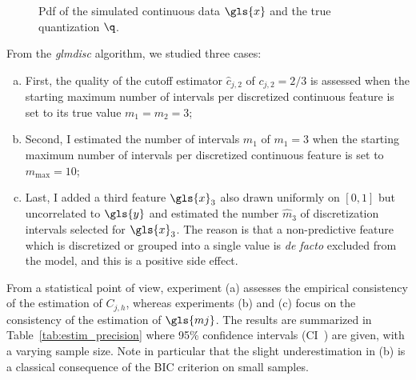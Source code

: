 \begin{figure}[!ht]
\centering
{}
\caption{\label{fig:exp_sim} Pdf of the simulated continuous data $\gls{x}$ and the true quantization $\q$.}
\end{figure}


From the \textit{glmdisc} algorithm, we studied three cases:
\begin{enumerate}[(a)]
    \item First, the quality of the cutoff estimator $\hat{c}_{j,2}$ of $c_{j,2} = 2/3$ is assessed when the starting maximum number of intervals per discretized continuous feature is set to its true value $m_1=m_2= 3$;
    \item Second, I estimated the number of intervals $\hat{m}_1$ of $m_1=3$ when the starting maximum number of intervals per discretized continuous feature is set to $m_{\text{max}} = 10$; 
    \item Last, I added a third feature $\gls{x}_3$ also drawn uniformly on $[0,1]$ but uncorrelated to $\gls{y}$ and estimated the number $\hat{m}_3$ of discretization intervals selected for $\gls{x}_3$. The reason is that a non-predictive feature which is discretized or grouped into a single value is \textit{de facto} excluded from the model, and this is a positive side effect.
\end{enumerate}
From a statistical point of view, experiment (a) assesses the empirical consistency of the estimation of $C_{j,h}$, whereas experiments (b) and (c) focus on the consistency of the estimation of $\gls{mj}$. The results are summarized in Table~\ref{tab:estim_precision} where 95\% confidence intervals (CI~\cite{sun2014fast}) are given, with a varying sample size. Note in particular that the slight underestimation in (b) is a classical consequence of the BIC criterion on small samples. 


